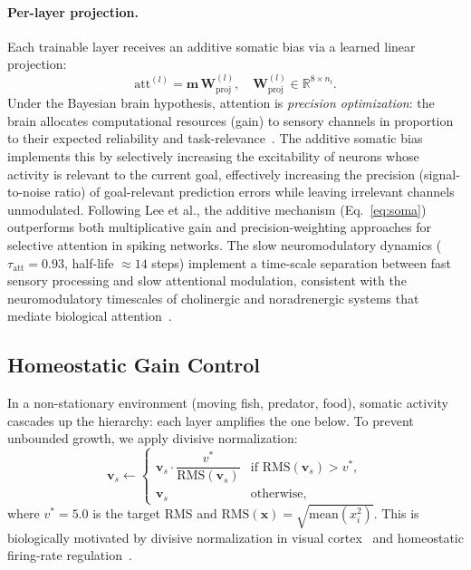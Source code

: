 \documentclass[11pt,a4paper]{article}
\begin{document}
\paragraph{Per-layer projection.}  Each trainable layer receives an
additive somatic bias via a learned linear projection:
\begin{equation}\label{eq:att_proj}
  \text{att}^{(l)} = \mathbf{m}\,\mathbf{W}_\text{proj}^{(l)},
  \quad \mathbf{W}_\text{proj}^{(l)} \in \mathbb{R}^{8 \times n_l}.
\end{equation}
Under the Bayesian brain hypothesis, attention is \emph{precision
optimization}: the brain allocates computational resources (gain) to
sensory channels in proportion to their expected reliability and
task-relevance~\cite{feldman2010}.
The additive somatic bias implements this by selectively
increasing the excitability of neurons whose activity is relevant to the
current goal, effectively increasing the precision (signal-to-noise ratio)
of goal-relevant prediction errors while leaving irrelevant channels
unmodulated.
Following Lee et al., the additive mechanism (Eq.~\ref{eq:soma})
outperforms both multiplicative gain and precision-weighting approaches
for selective attention in spiking networks.
The slow neuromodulatory dynamics ($\tau_\text{att} = 0.93$,
half-life $\approx 14$ steps) implement a time-scale separation between
fast sensory processing and slow attentional modulation, consistent with
the neuromodulatory timescales of cholinergic and noradrenergic systems
that mediate biological attention~\cite{feldman2010}.

\subsection{Homeostatic Gain Control}\label{sec:gain_control}

In a non-stationary environment (moving fish, predator, food), somatic
activity cascades up the hierarchy: each layer amplifies the one below.
To prevent unbounded growth, we apply divisive normalization:
\begin{equation}\label{eq:gain_control}
  \mathbf{v}_s \leftarrow
  \begin{cases}
    \mathbf{v}_s \cdot \dfrac{v^*}{\text{RMS}(\mathbf{v}_s)}
      & \text{if } \text{RMS}(\mathbf{v}_s) > v^*, \\[4pt]
    \mathbf{v}_s & \text{otherwise},
  \end{cases}
\end{equation}
where $v^* = 5.0$ is the target RMS and
$\text{RMS}(\mathbf{x}) = \sqrt{\text{mean}(x_i^2)}$.
This is biologically motivated by divisive normalization in visual
cortex~\cite{carandini2012} and homeostatic firing-rate
regulation~\cite{turrigiano2004}.
\end{document}
